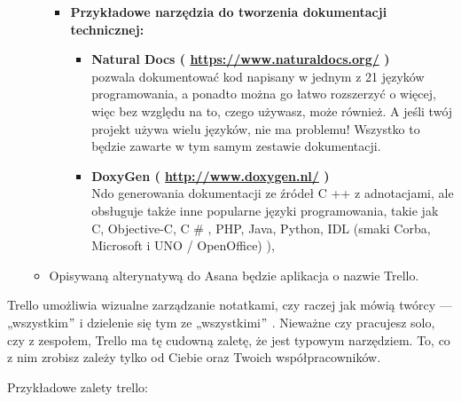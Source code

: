 \documentclass[12pt]{article}
\renewcommand{\_}{\kern-1.5pt\textunderscore\kern-1.5pt}
\begin{document}
\begin{itemize}
\begin{itemize}
\begin{itemize}
	\item \textbf{Przykładowe narzędzia do tworzenia dokumentacji technicznej:}\par

\begin{itemize}
	\item \textbf{Natural Docs ( \href{https://www.naturaldocs.org/}{https://www.naturaldocs.org/} )\\
}pozwala dokumentować kod napisany w jednym z 21 języków programowania, a ponadto można go łatwo rozszerzyć o więcej, więc bez względu na to, czego używasz, może również. A jeśli twój projekt używa wielu języków, nie ma problemu! Wszystko to będzie zawarte w tym samym zestawie dokumentacji.\par

	\item \textbf{DoxyGen ( \href{http://www.doxygen.nl/}{http://www.doxygen.nl/} )\\
}Ndo generowania dokumentacji ze źródeł C ++ z adnotacjami, ale obsługuje także inne popularne języki programowania, takie jak C, Objective-C, C $\#$ , PHP, Java, Python, IDL (smaki Corba, Microsoft i UNO / OpenOffice) ),\par


\vspace{\baselineskip}

\end{itemize}
\end{itemize}
	\item Opisywaną alterynatywą do Asana będzie aplikacja o nazwie Trello.
\end{itemize}
\end{itemize}\par

\begin{adjustwidth}{1.0in}{0.0in}
Trello umożliwia wizualne zarządzanie notatkami, czy raczej jak mówią twórcy — „wszystkim$"$  i dzielenie się tym ze „wszystkimi$"$ . Nieważne czy pracujesz solo, czy z zespołem, Trello ma tę cudowną zaletę, że jest typowym narzędziem. To, co z nim zrobisz zależy tylko od Ciebie oraz Twoich współpracowników.\par

\end{adjustwidth}

\begin{adjustwidth}{1.0in}{0.0in}
Przykładowe zalety trello:\par

\end{adjustwidth}
\end{document}
